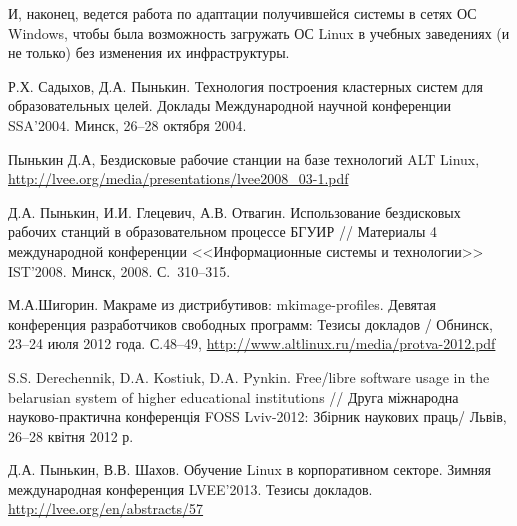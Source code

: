 \documentclass[10pt, a5paper]{article}
\begin{document}
И, наконец, ведется работа по адаптации получившейся системы в сетях ОС Windows, чтобы была возможность загружать ОС Linux в учебных заведениях (и не только) без изменения их инфраструктуры.

\begin{thebibliography}{9}

 Р.Х. Садыхов, Д.А. Пынькин. Технология построения кластерных систем для образо­вательных целей. Доклады Международной научной конференции SSA'2004. Минск, 26--28 октября 2004.

 Пынькин Д.А, Бездисковые рабочие станции на базе технологий ALT Linux, \url{http://lvee.org/media/presentations/lvee2008_03-1.pdf}

 Д.А. Пынькин, И.И. Глецевич, А.В. Отвагин. Использование бездисковых рабочих станций в образовательном процессе \linebreak БГУИР // Материалы 4 международной конференции <<Информационные системы и технологии>> IST’2008.  Минск, 2008.  С.~310--315.

 М.А.Шигорин. Макраме из дистрибутивов: mkimage-profiles. Девятая конференция разработчиков свободных программ: Тезисы докладов / Обнинск, 23–24 июля 2012 года. С.48--49, \url{http://www.altlinux.ru/media/protva-2012.pdf}

 S.S. Derechennik, D.A. Kostiuk, D.A. Pynkin. Free/libre software usage in the belarusian system of higher educational institutions // Друга міжнародна науково-практична конференція FOSS Lviv-2012: Збірник наукових праць/ Львів, 26--28 квітня 2012 р.

 Д.А. Пынькин, В.В. Шахов. Обучение Linux в корпоративном секторе. Зимняя международная конференция LVEE’2013. Тезисы докладов. \url{http://lvee.org/en/abstracts/57}
\end{thebibliography}
\end{document}
